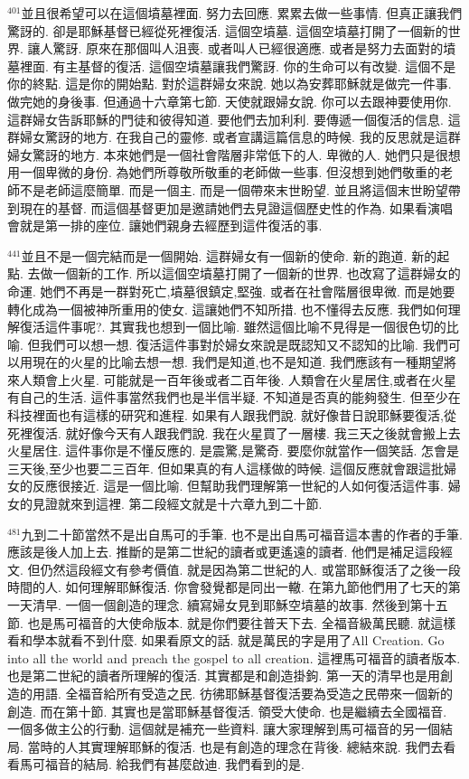 \documentclass{book}
\begin{document}
$^{401}$並且很希望可以在這個墳墓裡面.
努力去回應.
累累去做一些事情.
但真正讓我們驚訝的.
卻是耶穌基督已經從死裡復活.
這個空墳墓.
這個空墳墓打開了一個新的世界.
讓人驚訝.
原來在那個叫人沮喪.
或者叫人已經很適應.
或者是努力去面對的墳墓裡面.
有主基督的復活.
這個空墳墓讓我們驚訝.
你的生命可以有改變.
這個不是你的終點.
這是你的開始點.
對於這群婦女來說.
她以為安葬耶穌就是做完一件事.
做完她的身後事.
但通過十六章第七節.
天使就跟婦女說.
你可以去跟神要使用你.
這群婦女告訴耶穌的門徒和彼得知道.
要他們去加利利.
要傳遞一個復活的信息.
這群婦女驚訝的地方.
在我自己的靈修.
或者宣講這篇信息的時候.
我的反思就是這群婦女驚訝的地方.
本來她們是一個社會階層非常低下的人.
卑微的人.
她們只是很想用一個卑微的身份.
為她們所尊敬所敬重的老師做一些事.
但沒想到她們敬重的老師不是老師這麼簡單.
而是一個主.
而是一個帶來末世盼望.
並且將這個末世盼望帶到現在的基督.
而這個基督更加是邀請她們去見證這個歷史性的作為.
如果看演唱會就是第一排的座位.
讓她們親身去經歷到這件復活的事.

$^{441}$並且不是一個完結而是一個開始.
這群婦女有一個新的使命.
新的跑道.
新的起點.
去做一個新的工作.
所以這個空墳墓打開了一個新的世界.
也改寫了這群婦女的命運.
她們不再是一群對死亡,墳墓很鎮定,堅強.
或者在社會階層很卑微.
而是她要轉化成為一個被神所重用的使女.
這讓她們不知所措.
也不懂得去反應.
我們如何理解復活這件事呢?.
其實我也想到一個比喻.
雖然這個比喻不見得是一個很色切的比喻.
但我們可以想一想.
復活這件事對於婦女來說是既認知又不認知的比喻.
我們可以用現在的火星的比喻去想一想.
我們是知道,也不是知道.
我們應該有一種期望將來人類會上火星.
可能就是一百年後或者二百年後.
人類會在火星居住,或者在火星有自己的生活.
這件事當然我們也是半信半疑.
不知道是否真的能夠發生.
但至少在科技裡面也有這樣的研究和進程.
如果有人跟我們說.
就好像昔日說耶穌要復活,從死裡復活.
就好像今天有人跟我們說.
我在火星買了一層樓.
我三天之後就會搬上去火星居住.
這件事你是不懂反應的.
是震驚,是驚奇.
要麼你就當作一個笑話.
怎會是三天後,至少也要二三百年.
但如果真的有人這樣做的時候.
這個反應就會跟這批婦女的反應很接近.
這是一個比喻.
但幫助我們理解第一世紀的人如何復活這件事.
婦女的見證就來到這裡.
第二段經文就是十六章九到二十節.

$^{481}$九到二十節當然不是出自馬可的手筆.
也不是出自馬可福音這本書的作者的手筆.
應該是後人加上去.
推斷的是第二世紀的讀者或更遙遠的讀者.
他們是補足這段經文.
但仍然這段經文有參考價值.
就是因為第二世紀的人.
或當耶穌復活了之後一段時間的人.
如何理解耶穌復活.
你會發覺都是同出一轍.
在第九節他們用了七天的第一天清早.
一個一個創造的理念.
續寫婦女見到耶穌空墳墓的故事.
然後到第十五節.
也是馬可福音的大使命版本.
就是你們要往普天下去.
全福音級萬民聽.
就這樣看和學本就看不到什麼.
如果看原文的話.
就是萬民的字是用了All Creation.
Go into all the world and preach the gospel to all creation.
這裡馬可福音的讀者版本.
也是第二世紀的讀者所理解的復活.
其實都是和創造掛鉤.
第一天的清早也是用創造的用語.
全福音給所有受造之民.
彷彿耶穌基督復活要為受造之民帶來一個新的創造.
而在第十節.
其實也是當耶穌基督復活.
領受大使命.
也是繼續去全國福音.
一個多做主公的行動.
這個就是補充一些資料.
讓大家理解到馬可福音的另一個結局.
當時的人其實理解耶穌的復活.
也是有創造的理念在背後.
總結來說.
我們去看看馬可福音的結局.
給我們有甚麼啟迪.
我們看到的是.
\end{document}
